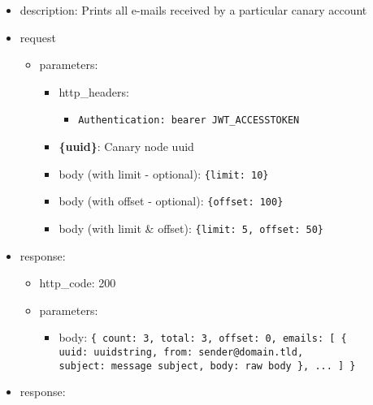 \documentclass[
]{article}
\begin{document}
\begin{itemize}
\item
  description: Prints all e-mails received by a particular canary
  account
\item
  request

  \begin{itemize}
  \item
    parameters:

    \begin{itemize}
    \item
      http\_headers:

      \begin{itemize}
      \item
        \texttt{Authentication:\ \textquotesingle{}bearer\ JWT\_ACCESSTOKEN\textquotesingle{}}
      \end{itemize}
    \item
      \textbf{\{uuid\}}: Canary node uuid
    \item
      body (with limit - optional):
      \texttt{\{\textquotesingle{}limit\textquotesingle{}:\ 10\}}
    \item
      body (with offset - optional):
      \texttt{\{\textquotesingle{}offset\textquotesingle{}:\ 100\}}
    \item
      body (with limit \& offset):
      \texttt{\{\textquotesingle{}limit\textquotesingle{}:\ 5,\ \textquotesingle{}offset\textquotesingle{}:\ 50\}}
    \end{itemize}
  \end{itemize}
\item
  response:

  \begin{itemize}
  \item
    http\_code: 200
  \item
    parameters:

    \begin{itemize}
    \item
      body: \texttt{\{
      \textquotesingle{}count\textquotesingle{}:\ 3,
      \textquotesingle{}total\textquotesingle{}:\ 3,
      \textquotesingle{}offset\textquotesingle{}:\ 0,
      \textquotesingle{}emails\textquotesingle{}:\ {[}
      	\{
      		\textquotesingle{}uuid\textquotesingle{}:\ \textquotesingle{}uuidstring\textquotesingle{},
      		\textquotesingle{}from\textquotesingle{}:\ \textquotesingle{}sender@domain.tld\textquotesingle{},
      		\textquotesingle{}subject\textquotesingle{}:\ \textquotesingle{}message\ subject\textquotesingle{},
      		\textquotesingle{}body\textquotesingle{}:\ \textquotesingle{}raw\ body\textquotesingle{}
      	\},
      	...
      {]}
      \}}
    \end{itemize}
  \end{itemize}
\item
  response:


\end{itemize}
\end{document}
